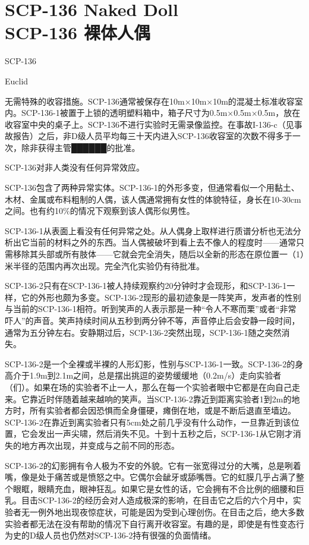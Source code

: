 \chapter[SCP-136 裸体人偶]{
    SCP-136 Naked Doll\\
    SCP-136 裸体人偶
}

\label{chap:SCP-136}

SCP-136

Euclid

无需特殊的收容措施。SCP-136通常被保存在10m×10m×10m的混凝土标准收容室内。SCP-136-1被置于上锁的透明塑料箱中，箱子尺寸为0.5m×0.5m×0.5m，放在收容室中央的桌子上。SCP-136不进行实验时无需录像监控。在事故I-136-c（见事故报告）之后，非D级人员平均每三十天内进入SCP-136收容室的次数不得多于一次，除非获得主管██████的批准。

SCP-136对非人类没有任何异常效应。

SCP-136包含了两种异常实体。SCP-136-1的外形多变，但通常看似一个用黏土、木材、金属或布料粗制的人偶，该人偶通常拥有女性的体貌特征，身长在10-30cm之间。也有约10\%的情况下观察到该人偶形似男性。

SCP-136-1从表面上看没有任何异常之处。从人偶身上取样进行质谱分析也无法分析出它当前的材料之外的东西。当人偶被破坏到看上去不像人的程度时——通常只需移除其头部或所有肢体——它就会完全消失，随后以全新的形态在原位置一（1）米半径的范围内再次出现。完全汽化实验仍有待批准。

SCP-136-2只有在SCP-136-1被人持续观察约20分钟时才会现形，和SCP-136-1一样，它的外形也颇为多变。SCP-136-2现形的最初迹象是一阵笑声，发声者的性别与当前的SCP-136-1相符。听到笑声的人表示那是一种“令人不寒而栗”或者“非常吓人”的声音。笑声持续时间从五秒到两分钟不等，声音停止后会安静一段时间，通常为五分钟左右。安静期过后，SCP-136-2突然出现，SCP-136-1随之突然消失。

SCP-136-2是一个全裸或半裸的人形幻影，性别与SCP-136-1一致。SCP-136-2的身高介于1.9m到2.1m之间，总是摆出挑逗的姿势缓缓地（0.2m\slash s）走向实验者（们）。如果在场的实验者不止一人，那么在每一个实验者眼中它都是在向自己走来。它靠近时伴随着越来越响的笑声。当SCP-136-2靠近到距离实验者1到2m的地方时，所有实验者都会因恐惧而全身僵硬，瘫倒在地，或是不断后退直至墙边。SCP-136-2在靠近到离实验者只有5cm处之前几乎没有什么动作，一旦靠近到该位置，它会发出一声尖啸，然后消失不见。十到十五秒之后，SCP-136-1从它刚才消失的地方再次出现，并变成与之前不同的形态。

SCP-136-2的幻影拥有令人极为不安的外貌。它有一张宽得过分的大嘴，总是咧着嘴，像是处于痛苦或是愤怒之中。它偶尔会龇牙或舔嘴唇。它的虹膜几乎占满了整个眼眶，眼睛充血，眼神狂乱。如果它是女性的话，它会拥有不合比例的细腰和巨乳。目击SCP-136-2的经历会对人造成极深的影响，在目击它之后的六个月中，实验者无一例外地出现夜惊症状，可能是因为受到心理创伤。在目击之后，绝大多数实验者都无法在没有帮助的情况下自行离开收容室。有趣的是，即使是有性变态行为史的D级人员也仍然对SCP-136-2持有很强的负面情绪。

